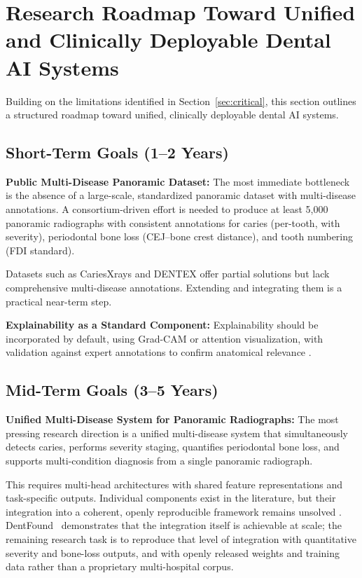 \documentclass[conference]{IEEEtran}
\begin{document}
\section{Research Roadmap Toward Unified and Clinically Deployable
Dental AI Systems}
\label{sec:roadmap}

Building on the limitations identified in Section~\ref{sec:critical},
this section outlines a structured roadmap toward unified, clinically
deployable dental AI systems.

\subsection{Short-Term Goals (1--2 Years)}

\textbf{Public Multi-Disease Panoramic Dataset:} The most immediate
bottleneck is the absence of a large-scale, standardized panoramic
dataset with multi-disease annotations. A consortium-driven effort is
needed to produce at least 5,000 panoramic radiographs with consistent
annotations for caries (per-tooth, with severity), periodontal bone loss
(CEJ--bone crest distance), and tooth numbering (FDI standard).

Datasets such as CariesXrays \cite{chen2024cariesxrays} and
DENTEX \cite{nassiri2025yolo} offer partial solutions but lack
comprehensive multi-disease annotations. Extending and integrating them
is a practical near-term step.

\textbf{Explainability as a Standard Component:} Explainability should
be incorporated by default, using Grad-CAM or attention visualization,
with validation against expert annotations to confirm anatomical
relevance
\cite{kaushik2025densenet201,bilal2024pdcnet}.

\subsection{Mid-Term Goals (3--5 Years)}

\textbf{Unified Multi-Disease System for Panoramic Radiographs:} The
most pressing research direction is a unified multi-disease system that
simultaneously detects caries, performs severity staging, quantifies
periodontal bone loss, and supports multi-condition diagnosis from a
single panoramic radiograph.

This requires multi-head architectures with shared feature
representations and task-specific outputs. Individual components exist
in the literature, but their integration into a coherent, openly
reproducible framework remains unsolved
\cite{nassiri2025yolo,chen2023deep,jundaeng2025advanced,
muresanu2024automating}. DentFound~\cite{zhu2026dentfound} demonstrates
that the integration itself is achievable at scale; the remaining
research task is to reproduce that level of integration with
quantitative severity and bone-loss outputs, and with openly released
weights and training data rather than a proprietary multi-hospital
corpus.
\end{document}
